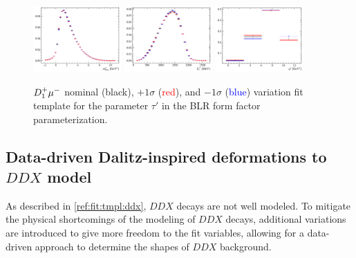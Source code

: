 \begin{figure}[!htb]
    \centering
    \includegraphics[width=0.3\textwidth]{./figs-fit-fit-variations/histo-var/D0_iso_D1ststMu__vs__D0_iso_D1ststMu_u1m__vs__D0_iso_D1ststMu_u1p__m2miss.pdf}
    \includegraphics[width=0.3\textwidth]{./figs-fit-fit-variations/histo-var/D0_iso_D1ststMu__vs__D0_iso_D1ststMu_u1m__vs__D0_iso_D1ststMu_u1p__el.pdf}
    \includegraphics[width=0.3\textwidth]{./figs-fit-fit-variations/histo-var/D0_iso_D1ststMu__vs__D0_iso_D1ststMu_u1m__vs__D0_iso_D1ststMu_u1p__q2.pdf}

    \caption{
        $D_1^+{\mu^-}$ nominal (black),
        $+ 1\sigma$ (\textcolor{red}{red}),
        and
        $- 1\sigma$ (\textcolor{blue}{blue})
        variation fit template for
        the parameter $\tau'$
        in the BLR form factor parameterization.
    }
    \label{fig:fit-variations:ff}
\end{figure}


\subsection{Data-driven Dalitz-inspired deformations to $DDX$ model}
\label{ref:fit:var:ddx}

As described in \cref{ref:fit:tmpl:ddx}, $DDX$ decays are not well modeled.
To mitigate the physical shortcomings of the modeling of $DDX$ decays,
additional variations are introduced to give more freedom to the fit variables,
allowing for a data-driven approach to determine the shapes of $DDX$ background.

